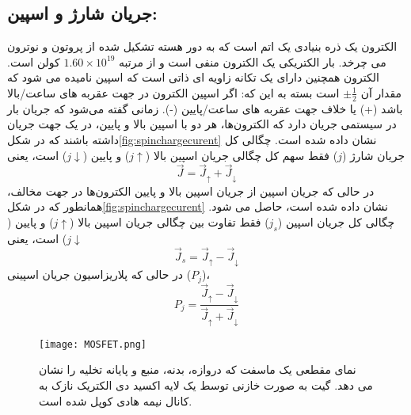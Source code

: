 \subsection{جریان شارژ و اسپین:}
الکترون یک ذره بنیادی یک اتم است که به دور هسته تشکیل شده از پروتون و نوترون می چرخد. بار الکتریکی یک الکترون منفی است و از مرتبه $1.60\times 10^19$ کولن است. الکترون همچنین دارای یک تکانه زاویه ای ذاتی است که اسپین نامیده می شود که مقدار آن $\pm\frac{1}{2}$ است بسته به این که: اگر اسپین الکترون در جهت عقربه های ساعت/بالا باشد (+) یا خلاف جهت عقربه های ساعت/پایین (-). زمانی گفته می‌شود که جریان بار در سیستمی جریان دارد که الکترون‌ها، هر دو با اسپین بالا و پایین، در یک جهت جریان داشته باشند که در شکل\ref{fig:spinchargecurent} نشان داده شده است. چگالی کل جریان شارژ ($j$) فقط سهم کل چگالی جریان اسپین بالا ($j\uparrow$) و پایین ($j\downarrow$) 
است، یعنی
\begin{equation}
    \vec{J}={\vec{J}}_{\uparrow }+{\vec{J}}_{\downarrow}
\end{equation}
در حالی که جریان اسپین از جریان اسپین بالا و پایین الکترون‌ها در جهت مخالف، همانطور که در شکل\ref{fig:spinchargecurent} نشان داده شده است، حاصل می شود. چگالی کل جریان اسپین ($j_s$) فقط تفاوت بین چگالی جریان اسپین بالا ($j\uparrow$) و پایین ($j\downarrow$) است، یعنی
\begin{equation}
    \vec{J}_{s} = \vec{J}_{\uparrow} - \vec{J}_{\downarrow}
\end{equation}
در حالی که پلاریزاسیون جریان اسپینی ($P_j$)،
\begin{equation}
    P_j = \frac{\vec{J}_{\uparrow} - \vec{J}_{\downarrow}}{\vec{J}_{\uparrow} + \vec{J}_{\downarrow}}
\end{equation}
\begin{figure*}[!ht]
    \centering
    \texttt{[image: MOSFET.png]}
    \caption{نمای مقطعی یک ماسفت که دروازه، بدنه، منبع و پایانه تخلیه را نشان می دهد. گیت به صورت خازنی توسط یک لایه اکسید دی الکتریک نازک به کانال نیمه هادی کوپل شده است.}
    \label{fig:mosfet}
\end{figure*}

